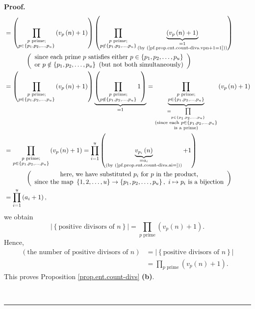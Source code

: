 \documentclass[numbers=enddot,12pt,final,onecolumn,notitlepage]{scrartcl}%
\numberwithin{exer}{subsection}
\theoremstyle{definition}
\newenvironment{proof}[1][Proof]{\noindent\textbf{#1.} }{\ \rule{0.5em}{0.5em}}
\let\prodnonlimits\prod
\renewcommand{\prod}{\prodnonlimits\limits}
\begin{document}
\begin{proof}
\begin{align*}
&  =\left(  \prod_{\substack{p\text{ prime;}\\p\in\left\{  p_{1},p_{2}%
,\ldots,p_{u}\right\}  }}\left(  v_{p}\left(  n\right)  +1\right)  \right)
\left(  \prod_{\substack{p\text{ prime;}\\p\notin\left\{  p_{1},p_{2}%
,\ldots,p_{u}\right\}  }}\underbrace{\left(  v_{p}\left(  n\right)  +1\right)
}_{\substack{=1\\\text{(by (\ref{pf.prop.ent.count-divs.vpn+1=1}))}}}\right)
\\
&  \ \ \ \ \ \ \ \ \ \ \left(
\begin{array}
[c]{c}%
\text{since each prime }p\text{ satisfies either }p\in\left\{  p_{1}%
,p_{2},\ldots,p_{u}\right\} \\
\text{or }p\notin\left\{  p_{1},p_{2},\ldots,p_{u}\right\}  \text{ (but not
both simultaneously)}%
\end{array}
\right) \\
&  =\left(  \prod_{\substack{p\text{ prime;}\\p\in\left\{  p_{1},p_{2}%
,\ldots,p_{u}\right\}  }}\left(  v_{p}\left(  n\right)  +1\right)  \right)
\underbrace{\left(  \prod_{\substack{p\text{ prime;}\\p\notin\left\{
p_{1},p_{2},\ldots,p_{u}\right\}  }}1\right)  }_{=1}=\underbrace{\prod
_{\substack{p\text{ prime;}\\p\in\left\{  p_{1},p_{2},\ldots,p_{u}\right\}
}}}_{\substack{=\prod_{p\in\left\{  p_{1},p_{2},\ldots,p_{u}\right\}
}\\\text{(since each }p\in\left\{  p_{1},p_{2},\ldots,p_{u}\right\}
\\\text{is a prime)}}}\left(  v_{p}\left(  n\right)  +1\right) \\
&  =\prod_{\substack{p\text{ prime;}\\p\in\left\{  p_{1},p_{2},\ldots
,p_{u}\right\}  }}\left(  v_{p}\left(  n\right)  +1\right)  =\prod_{i=1}%
^{u}\left(  \underbrace{v_{p_{i}}\left(  n\right)  }_{\substack{=a_{i}%
\\\text{(by (\ref{pf.prop.ent.count-divs.ai=}))}}}+1\right) \\
&  \ \ \ \ \ \ \ \ \ \ \left(
\begin{array}
[c]{c}%
\text{here, we have substituted }p_{i}\text{ for }p\text{ in the product,}\\
\text{since the map }\left\{  1,2,\ldots,u\right\}  \rightarrow\left\{
p_{1},p_{2},\ldots,p_{u}\right\}  ,\ i\mapsto p_{i}\text{ is a bijection}%
\end{array}
\right) \\
&  =\prod_{i=1}^{u}\left(  a_{i}+1\right)  ,
\end{align*}
we obtain%
\[
\left\vert \left\{  \text{positive divisors of }n\right\}  \right\vert
=\prod_{p\text{ prime}}\left(  v_{p}\left(  n\right)  +1\right)  .
\]
Hence,%
\begin{align*}
\left(  \text{the number of positive divisors of }n\right)   &  =\left\vert
\left\{  \text{positive divisors of }n\right\}  \right\vert \\
&  =\prod_{p\text{ prime}}\left(  v_{p}\left(  n\right)  +1\right)  .
\end{align*}
This proves Proposition \ref{prop.ent.count-divs} \textbf{(b)}.


\end{proof}
\end{document}
